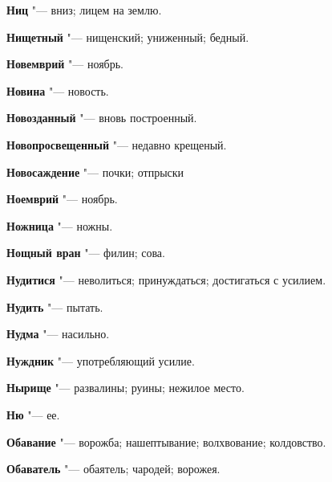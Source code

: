 \begin{mymulticols}{2}
\noindent\textbf{Ниц} "--- вниз; лицем на землю. 




\noindent\textbf{Нищетный} "--- нищенский; униженный; бедный. 




\noindent\textbf{Новемврий} "--- ноябрь. 




\noindent\textbf{Новина} "--- новость. 




\noindent\textbf{Новозданный} "--- вновь построенный. 




\noindent\textbf{Новопросвещенный} "--- недавно крещеный. 




\noindent\textbf{Новосаждение} "--- почки; отпрыски 




\noindent\textbf{Ноемврий} "--- ноябрь. 




\noindent\textbf{Ножница} "--- ножны. 




\noindent\textbf{Нощный вран} "--- филин; сова. 




\noindent\textbf{Нудитися} "--- неволиться; принуждаться; достигаться с усилием. 




\noindent\textbf{Нудить} "--- пытать. 




\noindent\textbf{Нудма} "--- насильно. 




\noindent\textbf{Нуждник} "--- употребляющий усилие. 




\noindent\textbf{Нырище} "--- развалины; руины; нежилое место. 




\noindent\textbf{Ню} "--- ее. 




\bukvaending






\noindent\textbf{Обавание} "--- ворожба; нашептывание; волхвование; колдовство. 




\noindent\textbf{Обаватель} "--- обаятель; чародей; ворожея. 





\end{mymulticols}
